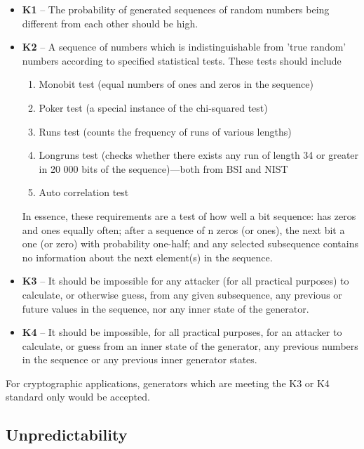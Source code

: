 \begin{itemize}
    \item \textbf{K1} – The probability of generated sequences of random numbers being different from each other should be high.
    \item \textbf{K2} – A sequence of numbers which is indistinguishable from 'true random' numbers according to specified statistical tests. These tests should include
    
        \begin{enumerate}
            \item Monobit test (equal numbers of ones and zeros in the sequence)
            \item Poker test (a special instance of the chi-squared test)
            \item Runs test (counts the frequency of runs of various lengths)
            \item Longruns test (checks whether there exists any run of length 34 or greater in 20 000 bits of the sequence)—both from BSI and NIST
            \item Auto correlation test
        \end{enumerate}
    
    In essence, these requirements are a test of how well a bit sequence: has zeros and ones equally often; after a sequence of n zeros (or ones), the next bit a one (or zero) with probability one-half; and any selected subsequence contains no information about the next element(s) in the sequence.
    \item \textbf{K3} – It should be impossible for any attacker (for all practical purposes) to calculate, or otherwise guess, from any given subsequence, any previous or future values in the sequence, nor any inner state of the generator.
    \item \textbf{K4} – It should be impossible, for all practical purposes, for an attacker to calculate, or guess from an inner state of the generator, any previous numbers in the sequence or any previous inner generator states.
\end{itemize}

For cryptographic applications, generators which are meeting the K3 or K4 standard only would be accepted.

\subsection{Unpredictability}

